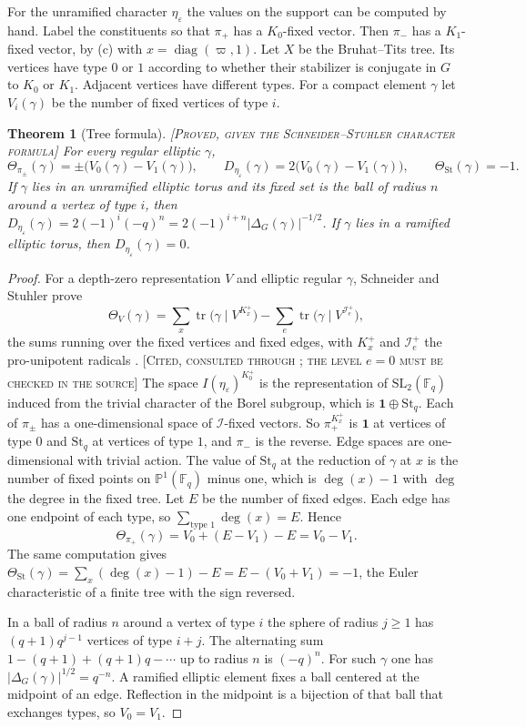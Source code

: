 \documentclass[12pt,letterpaper]{amsart}
\numberwithin{equation}{section}
\newtheorem{theorem}{Theorem}[section]
\theoremstyle{definition}
\theoremstyle{remark}
\newcommand{\St}{\mathrm{St}}
\newcommand{\triv}{\mathbf 1}
\newcommand{\tr}{\operatorname{tr}}
\newcommand{\status}[1]{\textup{[\textsc{#1}]}}
\begin{document}
For the unramified character $\eta_\varepsilon$ the values on the support can be computed by hand. Label the constituents so that $\pi_+$ has a $K_0$-fixed vector. Then $\pi_-$ has a $K_1$-fixed vector, by (c) with $x=\operatorname{diag}(\varpi,1)$. Let $X$ be the Bruhat--Tits tree. Its vertices have type $0$ or $1$ according to whether their stabilizer is conjugate in $G$ to $K_0$ or $K_1$. Adjacent vertices have different types. For a compact element $\gamma$ let $V_i(\gamma)$ be the number of fixed vertices of type $i$.

\begin{theorem}[Tree formula]\label{thm:tree}\status{Proved, given the Schneider--Stuhler character formula}
For every regular elliptic $\gamma$,
\[
\Theta_{\pi_\pm}(\gamma)=\pm\bigl(V_0(\gamma)-V_1(\gamma)\bigr),\qquad D_{\eta_\varepsilon}(\gamma)=2\bigl(V_0(\gamma)-V_1(\gamma)\bigr),\qquad \Theta_{\St}(\gamma)=-1 .
\]
If $\gamma$ lies in an unramified elliptic torus and its fixed set is the ball of radius $n$ around a vertex of type $i$, then $D_{\eta_\varepsilon}(\gamma)=2(-1)^i(-q)^n=2(-1)^{i+n}|\Delta_G(\gamma)|^{-1/2}$. If $\gamma$ lies in a ramified elliptic torus, then $D_{\eta_\varepsilon}(\gamma)=0$.
\end{theorem}
\begin{proof}
For a depth-zero representation $V$ and elliptic regular $\gamma$, Schneider and Stuhler prove
\[
\Theta_V(\gamma)=\sum_{x}\tr\bigl(\gamma\mid V^{K_x^+}\bigr)-\sum_{e}\tr\bigl(\gamma\mid V^{\mathcal I_e^+}\bigr),
\]
the sums running over the fixed vertices and fixed edges, with $K_x^+$ and $\mathcal I_e^+$ the pro-unipotent radicals \cite[Section III.4]{SS97}. \status{Cited, consulted through \cite{Ko04}; the level $e=0$ must be checked in the source} The space $I(\eta_\varepsilon)^{K_0^+}$ is the representation of $\mathrm{SL}_2(\mathbb F_q)$ induced from the trivial character of the Borel subgroup, which is $\triv\oplus\St_q$. Each of $\pi_\pm$ has a one-dimensional space of $\mathcal I$-fixed vectors. So $\pi_+^{K_x^+}$ is $\triv$ at vertices of type $0$ and $\St_q$ at vertices of type $1$, and $\pi_-$ is the reverse. Edge spaces are one-dimensional with trivial action. The value of $\St_q$ at the reduction of $\gamma$ at $x$ is the number of fixed points on $\mathbb P^1(\mathbb F_q)$ minus one, which is $\deg(x)-1$ with $\deg$ the degree in the fixed tree. Let $E$ be the number of fixed edges. Each edge has one endpoint of each type, so $\sum_{\text{type }1}\deg(x)=E$. Hence
\[
\Theta_{\pi_+}(\gamma)=V_0+(E-V_1)-E=V_0-V_1 .
\]
The same computation gives $\Theta_{\St}(\gamma)=\sum_x(\deg(x)-1)-E=E-(V_0+V_1)=-1$, the Euler characteristic of a finite tree with the sign reversed.

In a ball of radius $n$ around a vertex of type $i$ the sphere of radius $j\ge1$ has $(q+1)q^{j-1}$ vertices of type $i+j$. The alternating sum $1-(q+1)+(q+1)q-\cdots$ up to radius $n$ is $(-q)^n$. For such $\gamma$ one has $|\Delta_G(\gamma)|^{1/2}=q^{-n}$. A ramified elliptic element fixes a ball centered at the midpoint of an edge. Reflection in the midpoint is a bijection of that ball that exchanges types, so $V_0=V_1$.
\end{proof}
\end{document}
